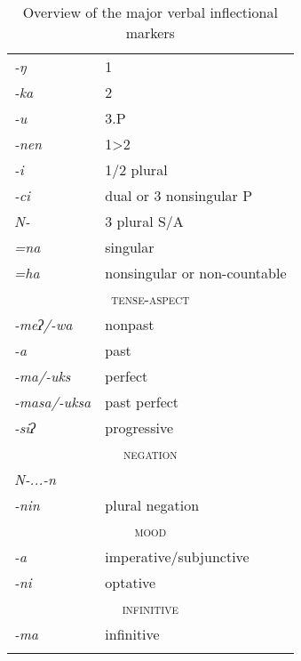 \begin{table}[p]
\begin{centering}
\begin{tabular}{ll}
\lsptoprule
\multicolumn{2}{c}{ {\scshape person-number}}\\
\midrule
\emph{-ŋ}&1\\
\emph{-ka}&2\\
\emph{-u}&3.P\\
\emph{-nen}&1>2\\
\emph{-i}&1/2 plural\\
\emph{-ci}&dual  or 3 nonsingular P \\
\emph{N-}&3 plural S/A\\
\emph{=na}&singular\\
\emph{=ha}&nonsingular or non-countable\\
\midrule
\multicolumn{2}{c}{ {\scshape tense-aspect}}\\
\midrule
\emph{-meʔ/-wa}&nonpast\\
\emph{-a}&past\\
\emph{-ma/-uks}&perfect\\
\emph{-masa/-uksa}&past perfect\\
\emph{-siʔ}&progressive\\
\midrule
\multicolumn{2}{c}{ {\scshape negation}}\\
\midrule
\emph{N-...-n}&\\
\emph{-nin}&plural negation\\
\midrule
\multicolumn{2}{c}{ {\scshape mood}}\\
\midrule
\emph{-a}&imperative/subjunctive\\
\emph{-ni}&optative\\
\midrule
\multicolumn{2}{c}{ {\scshape infinitive}}\\
\midrule
\emph{-ma}&infinitive\\
\lspbottomrule
\end{tabular}\\
\caption{Overview of the major verbal inflectional markers}\label{abc}
\end{centering}
\end{table} 

\pagestyle{empty}

